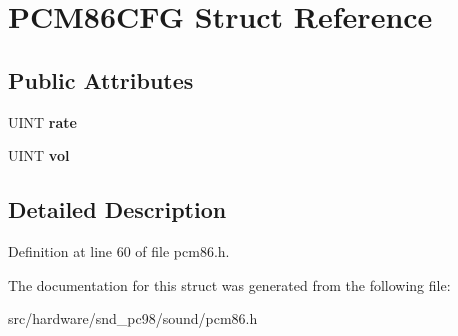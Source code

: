 \hypertarget{structPCM86CFG}{\section{P\-C\-M86\-C\-F\-G Struct Reference}
\label{structPCM86CFG}
}
\subsection*{Public Attributes}
\begin{DoxyCompactItemize}
\item 
\hypertarget{structPCM86CFG_a88ad6d9c960399bde230d41d4e896729}{U\-I\-N\-T {\bfseries rate}}\label{structPCM86CFG_a88ad6d9c960399bde230d41d4e896729}

\item 
\hypertarget{structPCM86CFG_af05e8efb682e5cb8c575f4670756f5a2}{U\-I\-N\-T {\bfseries vol}}\label{structPCM86CFG_af05e8efb682e5cb8c575f4670756f5a2}

\end{DoxyCompactItemize}


\subsection{Detailed Description}


Definition at line 60 of file pcm86.\-h.



The documentation for this struct was generated from the following file\-:\begin{DoxyCompactItemize}
\item 
src/hardware/snd\-\_\-pc98/sound/pcm86.\-h\end{DoxyCompactItemize}
